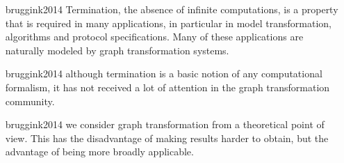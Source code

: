 \begin{itemize}
    \item[bruggink2014]  Termination, the absence of infinite computations, is a property that is required in many applications, in particular in model transformation, algorithms and protocol specifications. Many of these applications are naturally modeled by graph transformation systems.
    \item[bruggink2014] although termination is a basic notion of any computational formalism, it has not received a lot of attention in the graph transformation community.
    \item[bruggink2014] we consider graph transformation from a theoretical point of view. This has the disadvantage of making results harder to obtain, but the advantage of being more broadly applicable. 
\end{itemize}

